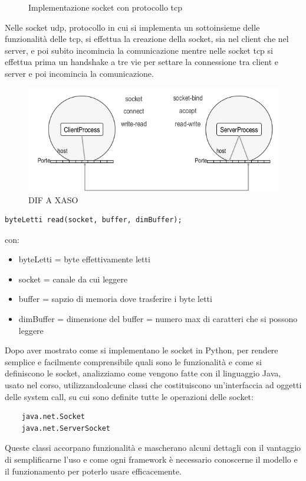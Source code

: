 \documentclass[a4paper,12pt, oneside]{book}
\begin{document}
\begin{figure}
    \caption{Implementazione socket con protocollo tcp}\label{tcpSocket}
    \inputminted{python}{code/tcpClient.py}
    \inputminted{python}{code/tcpServer.py}
\end{figure}
Nelle socket udp, protocollo in cui si implementa un sottoinsieme delle funzionalità delle tcp, 
si effettua la creazione della socket, sia nel client che nel server, e poi subito incomincia la 
comunicazione mentre nelle socket tcp si effettua prima un handshake a tre vie per settare la connessione
tra client e server e poi incomincia la comunicazione.

\begin{figure}
    \caption{DIF A XASO}
	\includegraphics[scale=3]{img/sc4.png}
\end{figure}

\begin{verbatim}
byteLetti read(socket, buffer, dimBuffer);
\end{verbatim}
con:
\begin{itemize}
	\item byteLetti = byte effettivamente letti
	\item socket = canale da cui leggere
	\item buffer = sapzio di memoria dove trasferire i byte letti
	\item dimBuffer = dimensione del buffer = numero max di caratteri che si possono leggere
\end{itemize}

Dopo aver mostrato come si implementano le socket in Python, per rendere semplice e facilmente comprensibile
quali sono le funzionalità e come si definiscono le socket, analizziamo come vengono fatte con il linguaggio
Java, usato nel corso, utilizzandoalcune classi che costituiscono un'interfaccia ad oggetti 
delle system call, su cui sono definite tutte le operazioni delle socket:
\begin{verbatim}
    java.net.Socket
    java.net.ServerSocket
\end{verbatim}
Queste classi accorpano funzionalità e mascherano alcuni dettagli con il vantaggio di semplificarne l'uso
e come ogni framework è necessario conoscerne il modello e il funzionamento per poterlo usare efficacemente. 
\end{document}
